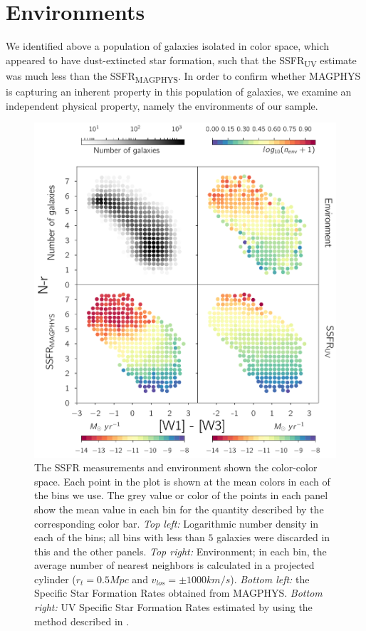 \section{Environments}

We identified above a population of galaxies isolated in 
color space, which appeared to have dust-extincted star formation, 
such that the SSFR\textsubscript{UV} estimate was much less 
than the SSFR\textsubscript{MAGPHYS}. In order to confirm whether 
MAGPHYS is capturing an inherent property in this population of 
galaxies, we examine an independent physical property, namely 
the environments of our sample.\\

\begin{figure}
\includegraphics[width=\textwidth]{figures/1_panel_plot.pdf}
\caption[Short figure name.]{The SSFR measurements and environment 
    shown the color-color 
    space. Each point in the plot is shown at the mean colors in each of 
    the bins we use. The grey value or color of the points in each
    panel show the mean value in each bin for the quantity described 
    by the corresponding  color bar.
    \emph{Top left:} Logarithmic number density in each of the 
    bins; all bins with less than $5$ galaxies were discarded in this 
    and the other panels. \emph{Top right:} Environment; in each bin, 
    the average number of nearest neighbors is calculated in a 
    projected cylinder ($r_{t} = 0.5 Mpc$ and $v_{los} = \pm 1000 km/s$). 
    \emph{Bottom left:} the Specific Star Formation Rates obtained from 
    MAGPHYS. \emph{Bottom right:} UV Specific Star Formation Rates 
    estimated by using the method described in \citet{salim_uv_2007}.
\label{fig:myInlineFigure}}
\end{figure}

